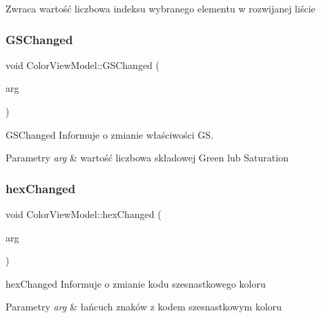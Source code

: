 \begin{DoxyReturn}{Zwraca}
wartość liczbowa indeksu wybranego elementu w rozwijanej liście 
\end{DoxyReturn}
\mbox{\label{class_color_view_model_ab36d827240046bae55a0a7e18b50fcc3}} 
\subsubsection{\texorpdfstring{G\+S\+Changed}{GSChanged}}
{\footnotesize\ttfamily void Color\+View\+Model\+::\+G\+S\+Changed (\begin{DoxyParamCaption}\item[{int}]{arg }\end{DoxyParamCaption})\hspace{0.3cm}{\ttfamily [signal]}}



G\+S\+Changed Informuje o zmianie właściwości GS. 


\begin{DoxyParams}{Parametry}
{\em arg} & wartość liczbowa składowej Green lub Saturation \\
\hline
\end{DoxyParams}
\mbox{\label{class_color_view_model_aff6ce1151bebe9048a61b99742ad6492}} 
\subsubsection{\texorpdfstring{hex\+Changed}{hexChanged}}
{\footnotesize\ttfamily void Color\+View\+Model\+::hex\+Changed (\begin{DoxyParamCaption}\item[{Q\+String}]{arg }\end{DoxyParamCaption})\hspace{0.3cm}{\ttfamily [signal]}}



hex\+Changed Informuje o zmianie kodu szesnastkowego koloru 


\begin{DoxyParams}{Parametry}
{\em arg} & łańcuch znaków z kodem szesnastkowym koloru \\
\hline
\end{DoxyParams}
\mbox{\label{class_color_view_model_ae82220bcc3ce7136ae025d8ba84c1ef5}} 
